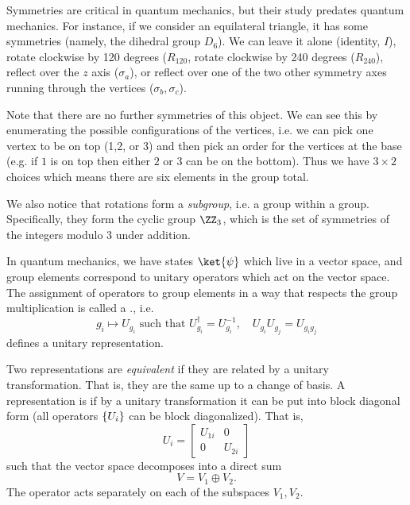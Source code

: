 Symmetries are critical in quantum mechanics, but their study predates quantum mechanics. For instance, if we consider an equilateral triangle, it has some symmetries (namely, the dihedral group $D_6$). We can leave it alone (identity, $I$), rotate clockwise by 120 degrees ($R_{120}$, rotate clockwise by 240 degrees ($R_{240}$), reflect over the $z$ axis ($\sigma_a$), or reflect over one of the two other symmetry axes running through the vertices ($\sigma_b,\sigma_c$).

Note that there are no further symmetries of this object. We can see this by enumerating the possible configurations of the vertices, i.e. we can pick one vertex to be on top (1,2, or 3) and then pick an order for the vertices at the base (e.g. if $1$ is on top then either $2$ or $3$ can be on the bottom). Thus we have $3\times 2$ choices which means there are six elements in the group total.

We also notice that rotations form a \emph{subgroup}, i.e. a group within a group. Specifically, they form the cyclic group $\ZZ_3$, which is the set of symmetries of the integers modulo 3 under addition.

In quantum mechanics, we have states $\ket{\psi}$ which live in a vector space, and group elements correspond to unitary operators which act on the vector space. The assignment of operators to group elements in a way that respects the group multiplication is called a ., i.e.
\begin{equation}
    g_i \mapsto U_{g_i}\text{ such that } U_{g_i}^\dagger =U_{g_i}^{-1}, \quad U_{g_i} U_{g_j} = U_{g_i g_j}
\end{equation}
defines a unitary representation.

Two representations are \emph{equivalent} if they are related by a unitary transformation. That is, they are the same up to a change of basis. A representation is  if by a unitary transformation it can be put into block diagonal form (all operators $\{U_i\}$ can be block diagonalized). That is,
\begin{equation}
    U_i = \begin{bmatrix}
        U_{1i} & 0\\
        0 & U_{2i}
    \end{bmatrix}
\end{equation}
such that the vector space decomposes into a direct sum
\begin{equation}
    V= V_1 \oplus V_2.
\end{equation}
The operator acts separately on each of the subspaces $V_1,V_2$.

